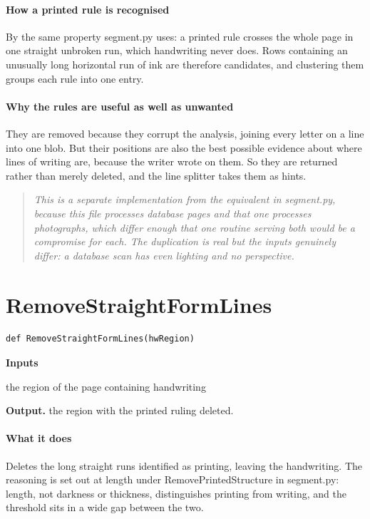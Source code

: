 \paragraph{How a printed rule is recognised}
By the same property segment.py uses: a printed rule crosses the whole page in one straight unbroken run, which handwriting never does. Rows containing an unusually long horizontal run of ink are therefore candidates, and clustering them groups each rule into one entry.


\paragraph{Why the rules are useful as well as unwanted}
They are removed because they corrupt the analysis, joining every letter on a line into one blob. But their positions are also the best possible evidence about where lines of writing are, because the writer wrote on them. So they are returned rather than merely deleted, and the line splitter takes them as hints.


\begin{quote}\small\itshape This is a separate implementation from the equivalent in segment.py, because this file processes database pages and that one processes photographs, which differ enough that one routine serving both would be a compromise for each. The duplication is real but the inputs genuinely differ: a database scan has even lighting and no perspective.\end{quote}

\section{RemoveStraightFormLines}
\begin{lstlisting}[style=sig]
def RemoveStraightFormLines(hwRegion)
\end{lstlisting}

\noindent\textbf{Inputs}
\begin{description}[leftmargin=2.2em,style=nextline,font=\normalfont\ttfamily]\setlength\itemsep{1pt}
  \item[{hwRegion}] \normalfont the region of the page containing handwriting
\end{description}

\noindent\textbf{Output.} the region with the printed ruling deleted.


\paragraph{What it does}
Deletes the long straight runs identified as printing, leaving the handwriting. The reasoning is set out at length under RemovePrintedStructure in segment.py: length, not darkness or thickness, distinguishes printing from writing, and the threshold sits in a wide gap between the two.



